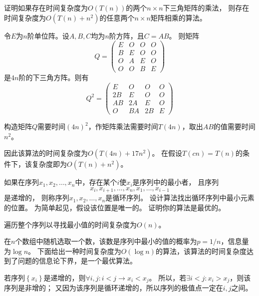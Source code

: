 \documentclass[answers]{exam}
\begin{document}
\begin{questions}
\begin{solution}
    \end{solution}

    \question 证明如果存在时间复杂度为$O(T(n))$的两个$n \times n$下三角矩阵的乘法，
    则存在时间复杂度为$O(T(n)+n^2)$的任意两个$n \times n$矩阵相乘的算法。

    \begin{solution}
        令$E$为$n$阶单位阵。设$A,B,C$均为$n$阶方阵，且$C = AB$。
        则矩阵\[
            Q = \begin{pmatrix}
                E & O & O & O \\
                B & E & O & O \\
                O & A & E & O \\
                O & O & B & E
            \end{pmatrix}
        \]是$4n$阶的下三角方阵。则有
        \[
            Q^2 = \begin{pmatrix}
                E  & O  & O  & O \\
                2B & E  & O  & O \\
                AB & 2A & E  & O \\
                O  & BA & 2B & E
            \end{pmatrix}
        \]

        构造矩阵$Q$需要时间$(4n)^2$，作矩阵乘法需要时间$T(4n)$，取出$AB$的值需要时间$n^2$。

        因此该算法的时间复杂度为$O(T(4n) + 17n^2)$。
        在假设$T(cn) = T(n)$的条件下，该复杂度即为$O(T(n)+n^2)$。
    \end{solution}

    \question  如果在序列$x_1,x_2, \dots ,x_n$中，存在某个$i$使$x_i$是序列中的最小者，
    且序列\[ x_i,x_{i+1}, \dots ,x_n,x_1,\dots, x_{i-1} \]是递增的，
    则称序列$x_1,x_2, \dots ,x_n$是循环序列。
    设计算法找出循环序列中最小元素的位置。
    为简单起见，假设该位置是唯一的。
    证明你的算法是最优的。

    \begin{solution}
        遍历整个序列以寻找最小值的时间复杂度为$O(n)$。

        在$n$个数组中随机选取一个数，该数是序列中最小的值的概率为$p = 1 / n$，信息量为$\log n$。
        下面给出一种时间复杂度为$O(\log n)$的算法，该算法的时间复杂度达到了问题的信息论下界，是一个最优算法。

        若序列$\left\{x_i\right\}$是递增的，则$\forall i,j : i < j \rightarrow x_i < x_j$。
        所以，若$\exists i < j : x_i > x_j $，则该序列是非增的；
        又因为该序列是循环递增的，所以序列的极值点一定在$i,j$之间。


\end{solution}
\end{questions}
\end{document}
